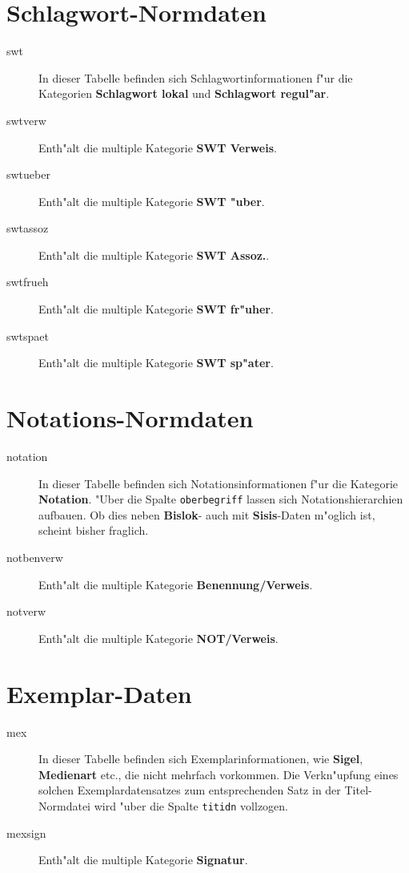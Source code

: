 \documentclass[11pt, twoside, a4paper, BCOR8mm, DIV12, bibtotoc,idxtotoc]{scrbook}
\begin{document}
\section{Schlagwort-Normdaten}

\begin{description}
\item[swt] In dieser Tabelle befinden sich Schlagwortinformationen
  f"ur die Kategorien \textbf{Schlagwort lokal} und \textbf{Schlagwort
    regul"ar}.
\item[swtverw] Enth"alt die multiple Kategorie \textbf{SWT Verweis}.
\item[swtueber] Enth"alt die multiple Kategorie \textbf{SWT "uber}.
\item[swtassoz] Enth"alt die multiple Kategorie \textbf{SWT Assoz.}.
\item[swtfrueh] Enth"alt die multiple Kategorie \textbf{SWT fr"uher}.
\item[swtspaet] Enth"alt die multiple Kategorie \textbf{SWT sp"ater}.
\end{description}


\section{Notations-Normdaten}

\begin{description}
\item[notation] In dieser Tabelle befinden sich Notationsinformationen
  f"ur die Kategorie \textbf{Notation}. "Uber die Spalte
  \texttt{oberbegriff} lassen sich Notationshierarchien aufbauen. Ob
  dies neben \textbf{Bislok}- auch mit \textbf{Sisis}-Daten m"oglich
  ist, scheint bisher fraglich.
\item[notbenverw] Enth"alt die multiple Kategorie
  \textbf{Benennung/Verweis}.
\item[notverw] Enth"alt die multiple Kategorie \textbf{NOT/Verweis}.
\end{description}


\section{Exemplar-Daten}

\begin{description}
\item[mex] In dieser Tabelle befinden sich Exemplarinformationen, wie
  \textbf{Sigel}, \textbf{Medienart} etc., die nicht mehrfach
  vorkommen. Die Verkn"upfung eines solchen Exemplardatensatzes zum
  ent\-sprechen\-den Satz in der Titel-Normdatei wird "uber die Spalte
  \texttt{titidn} vollzogen.
\item[mexsign] Enth"alt die multiple Kategorie \textbf{Signatur}.
\end{description}
\end{document}
